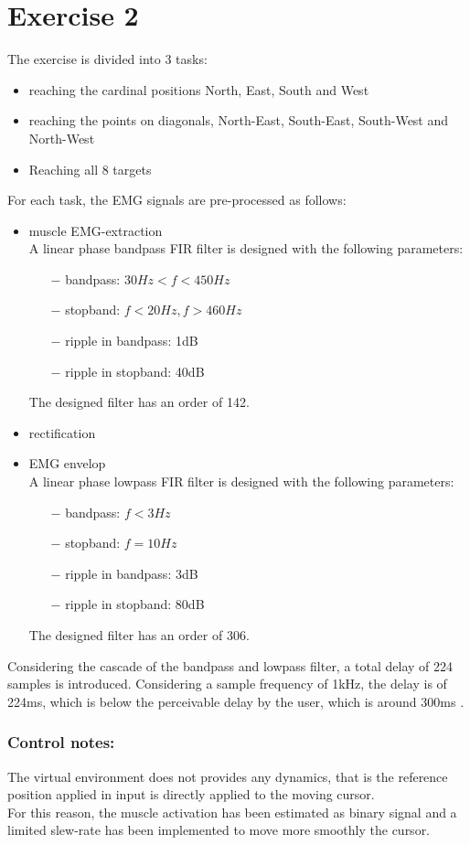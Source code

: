 \documentclass{article}
\begin{document}
	\section*{Exercise 2}
	The exercise is divided into 3 tasks:
	\begin{itemize}
		\item reaching the cardinal positions North, East, South and West
		\item reaching the points on diagonals, North-East, South-East, South-West and North-West
		\item Reaching all 8 targets
	\end{itemize}
	For each task, the EMG signals are pre-processed as follows:
	\begin{itemize}
		\item muscle EMG-extraction\\
			A linear phase bandpass FIR filter is designed with the following parameters:
		\begin{itemize}
			\item[$-$]bandpass: $30Hz < f < 450Hz$
			\item[$-$]stopband: $f < 20Hz, f > 460Hz$
			\item[$-$]ripple in bandpass: 1dB
			\item[$-$]ripple in stopband: 40dB
		\end{itemize}
		The designed filter has an order of 142.
		\item rectification
		\item EMG envelop\\
			A linear phase lowpass FIR filter is designed with the following parameters:
		\begin{itemize}
			\item[$-$]bandpass: $f < 3Hz$
			\item[$-$]stopband: $f = 10Hz$
			\item[$-$]ripple in bandpass: 3dB
			\item[$-$]ripple in stopband: 80dB
		\end{itemize}
		The designed filter has an order of 306.
	\end{itemize}
	Considering the cascade of the bandpass and lowpass filter, a total delay of 224 samples is introduced. Considering a sample frequency of 1kHz, the delay is of 224ms, which is below the perceivable delay by the user, which is around 300ms \cite{delaySensitivity}.
	
	\subsubsection*{Control notes:}
	The virtual environment does not provides any dynamics, that is the reference position applied in input is directly applied to the moving cursor.\\
	For this reason, the muscle activation has been estimated as binary signal and a limited slew-rate has been implemented to move more smoothly the cursor.
	
\end{document}
